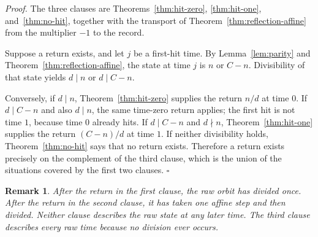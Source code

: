 \documentclass[11pt,letterpaper]{article}
\newtheorem{remark}[theorem]{Remark}
\newenvironment{proof}{\noindent\textit{Proof.}}{\hfill\(\square\)}
\begin{document}
\begin{proof}
The three clauses are Theorems~\ref{thm:hit-zero}, \ref{thm:hit-one},
and~\ref{thm:no-hit}, together with the transport of
Theorem~\ref{thm:reflection-affine} from the multiplier \(-1\) to the record.

Suppose a return exists, and let \(j\) be a first-hit time. By
Lemma~\ref{lem:parity} and Theorem~\ref{thm:reflection-affine}, the state at
time \(j\) is \(n\) or \(C-n\). Divisibility of that state yields
\(d\mid n\) or \(d\mid C-n\).

Conversely, if \(d\mid n\), Theorem~\ref{thm:hit-zero} supplies the return
\(n/d\) at time \(0\). If \(d\mid C-n\) and also \(d\mid n\), the same
time-zero return applies; the first hit is not time \(1\), because time \(0\)
already hits. If \(d\mid C-n\) and \(d\nmid n\), Theorem~\ref{thm:hit-one}
supplies the return \((C-n)/d\) at time \(1\). If neither divisibility holds,
Theorem~\ref{thm:no-hit} says that no return exists. Therefore a return
exists precisely on the complement of the third clause, which is the union
of the situations covered by the first two clauses.
\end{proof}

\begin{remark}
\label{rem:not-after-division}
After the return in the first clause, the raw orbit has divided once. After
the return in the second clause, it has taken one affine step and then
divided. Neither clause describes the raw state at any later time. The third
clause describes every raw time because no division ever occurs.
\end{remark}
\end{document}
